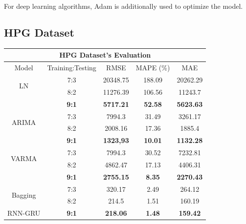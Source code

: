 \documentclass{ieeeojies}
\begin{document}
For deep learning algorithms, Adam is additionally used to optimize the model.
\subsection{HPG Dataset} 
\begin{table}[H]
    \centering
    \begin{tabular}{|c|c|c|c|c|}
         \hline
         \multicolumn{5}{|c|}{\textbf{HPG Dataset's Evaluation}}\\
         \hline
         \centering Model & Training:Testing & RMSE & MAPE (\%) & MAE\\
         \hline
         \multirow{2}{*}{LN} & 7:3 & 20348.75 & 188.09 & 20262.29 \\ & 8:2 & 11276.39 & 106.56 & 11243.7 \\ & \textbf{9:1} & \textbf{5717.21} & \textbf{52.58} & \textbf{5623.63}\\
         \hline
         \multirow{2}{*}{ARIMA} & 7:3& 7994.3 & 31.49 & 3261.17 \\ & 8:2& 2008.16&17.36&1885.4 \\ & \textbf{9:1} & \textbf{1323,93} & \textbf{10.01} & \textbf{1132.28}\\
         \hline
         \multirow{2}{*}{VARMA} & 7:3	& 7994.3 & 30.52 & 7232.81 \\ & 8:2 & 4862.47 & 17.13 & 4406.31 \\ & \textbf{9:1} & \textbf{2755.15}  & \textbf{8.35} & \textbf{2270.43}\\
         \hline

        \multirow{2}{*}{Bagging} & 7:3	& 320.17 & 2.49 & 264.12 \\& 8:2 & 214.5 & 1.51 & 160.19 \\ {RNN-GRU}& \textbf{9:1} & \textbf{218.06}  & \textbf{1.48} & \textbf{159.42}\\
         \hline
         

\end{tabular}
\end{table}
\end{document}
